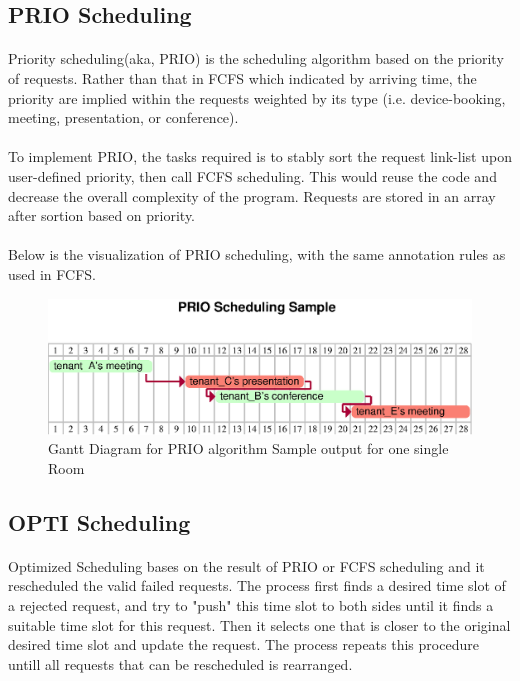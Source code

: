 \documentclass{article}
\begin{document}
        \subsection{PRIO Scheduling}
            \paragraph{}
            Priority scheduling(aka, PRIO) is the scheduling algorithm based on the
                priority of requests. Rather than that in FCFS which indicated by arriving time, the priority are implied within the requests weighted by its type (i.e. device-booking, meeting, presentation, or conference). 
            \paragraph{}
            To implement PRIO, the tasks required is to stably sort the request link-list upon user-defined priority, then call FCFS scheduling. This would reuse the code and decrease the overall complexity of the program.
                Requests are stored in an array after sortion based on priority. 
            \paragraph{}
            Below is the visualization of PRIO scheduling, with the same annotation rules as used in FCFS.
            \begin{figure}[!htbp]
                \centering
                \includegraphics[scale=0.7]{../res/eps/prio_scheduling.eps}
                \caption{Gantt Diagram for PRIO algorithm Sample output for one single Room}
            \end{figure}
        \subsection{OPTI Scheduling}
            \paragraph{}
                Optimized Scheduling bases on the result of PRIO or FCFS scheduling and it rescheduled the valid failed requests. The process first finds a desired time slot  of a rejected request, and try to "push" this time slot to both sides until it finds a suitable time slot for this request. Then it selects one that is closer to the original desired time slot and update the request. The process repeats this procedure untill all requests that can be rescheduled is rearranged.
    \cleardoublepage
\end{document}
